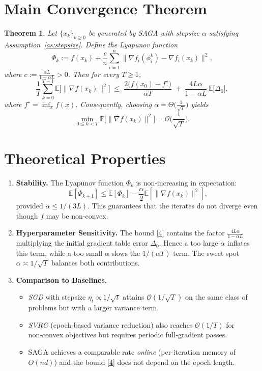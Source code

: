 \documentclass{article}
\newtheorem{theorem}{Theorem}
\newcommand{\E}{\mathbb{E}}
\begin{document}

\section*{Main Convergence Theorem}
\begin{theorem}\label{thm:main}
Let $\{x_k\}_{k\ge0}$ be generated by SAGA with stepsize $\alpha$ satisfying Assumption~\ref{as:stepsize}.
Define the Lyapunov function
\[
\Phi_k:= f(x_k)+\frac{c}{n}\sum_{i=1}^{n}\|\nabla f_i(\phi_i^k)-\nabla f_i(x_k)\|^{2},
\]
where $c:=\frac{\alpha L}{1-\alpha L}>0$.
Then for every $T\ge1$,
\[
\frac{1}{T}\sum_{k=0}^{T-1}\E\!\big[\|\nabla f(x_k)\|^{2}\big]
\;\le\;
\frac{2\big(f(x_0)-f^{\star}\big)}{\alpha T}
\;+\;
\frac{4L\alpha}{1-\alpha L}\, \E\!\big[\Delta_0\big],
\tag{4}
\]
where $f^{\star}=\inf_{x}f(x)$.
Consequently, choosing $\alpha =\Theta\!\big(\frac{1}{\sqrt{T}}\big)$ yields
\[
\min_{0\le k<T}\E\!\big[\|\nabla f(x_k)\|^{2}\big]=\mathcal{O}\!\Big(\frac{1}{\sqrt{T}}\Big).
\]
\end{theorem}

\section*{Theoretical Properties}
\begin{enumerate}[label=\arabic*.]
\item \textbf{Stability.} The Lyapunov function $\Phi_k$ is non‑increasing in expectation:
\[
\E[\Phi_{k+1}]\le \E[\Phi_k]-\frac{\alpha}{2}\E[\|\nabla f(x_k)\|^{2}],
\]
provided $\alpha\le 1/(3L)$. This guarantees that the iterates do not diverge even though $f$ may be non‑convex.

\item \textbf{Hyperparameter Sensitivity.}
The bound \eqref{4} contains the factor $\frac{4L\alpha}{1-\alpha L}$ multiplying the initial gradient table error $\Delta_0$.
Hence a too large $\alpha$ inflates this term, while a too small $\alpha$ slows the $1/(\alpha T)$ term.
The sweet spot $\alpha\asymp 1/\sqrt{T}$ balances both contributions.

\item \textbf{Comparison to Baselines.}
\begin{itemize}
\item \emph{SGD} with stepsize $\eta_t\propto 1/\sqrt{t}$ attains $\mathcal{O}(1/\sqrt{T})$ on the same class of problems but with a larger variance term.
\item \emph{SVRG} (epoch‑based variance reduction) also reaches $\mathcal{O}(1/T)$ for non‑convex objectives but requires periodic full‑gradient passes.
\item SAGA achieves a comparable rate \emph{online} (per‑iteration memory of $O(nd)$) and the bound \eqref{4} does not depend on the epoch length.
\end{itemize}
\end{enumerate}
\end{document}
